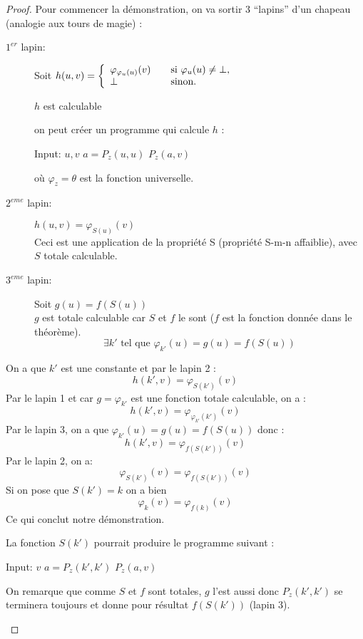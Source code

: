 \begin{proof}
Pour commencer la démonstration, on va sortir 3 ``lapins'' d'un chapeau (analogie aux tours de magie) :
\begin{description}

	\item[$1^{er}$ lapin:] Soit $ h(u,v) = \left\{
	\begin{array}{l l}
		\varphi_{\varphi_{u}(u)}(v) & \quad \text{si }\varphi_u(u)\neq \bot,\\
    	\bot & \quad \text{sinon}.
	\end{array} \right.$

		$h$ est calculable
		\begin{myrem}
			on peut créer un programme qui calcule $h$ :
            \begin{algorithmic}
              \STATE Input: $u,v$
              \STATE $a = P_z(u,u)$
              \STATE $P_z(a,v)$
            \end{algorithmic}
            où $\varphi_z = \theta$ est la fonction universelle.
		\end{myrem}

	\item[$2^{eme}$ lapin:] $h(u,v)=\varphi_{S(u)}(v)$\\
	Ceci est une application de la propriété S (propriété S-m-n affaiblie), avec $S$ totale calculable.
  
	\item[$3^{eme}$ lapin:] Soit $g(u)=f(S(u))$\\
	 $g$ est totale calculable car $S$ et $f$ le sont ($f$
		est la fonction donnée dans le théorème).
		\[ \exists k' \text{ tel que } \varphi_{k'}(u) =g(u)=f(S(u)) \]
\end{description}
On a que $k'$ est une constante et par le lapin 2 :
\[h(k',v) = \varphi_{S(k')}(v)\]
Par le lapin 1 et car $g=\varphi_{k'}$ est une fonction totale calculable, on a :
\[h(k',v) = \varphi_{\varphi_{k'}(k')}(v)\]
Par le lapin 3, on a que $\varphi_{k'}(u) = g(u)=f(S(u))$ donc :
\[h(k',v) = \varphi_{f(S(k'))}(v)\]
Par le lapin 2, on a:
\[ \varphi_{S(k')}(v) =\varphi_{f(S(k'))}(v) \]
Si on pose que $S(k')=k$ on a bien
\[ \varphi_{k}(v) = \varphi_{f(k)}(v) \]
Ce qui conclut notre démonstration.
		\begin{myrem}
          La fonction $S(k')$ pourrait produire le programme suivant :
          \begin{algorithmic}
            \STATE Input: $v$
            \STATE $a = P_z(k',k')$
            \STATE $P_z(a,v)$
          \end{algorithmic}
          On remarque que comme $S$ et $f$ sont totales,
          $g$ l'est aussi donc $P_z(k',k')$ se terminera toujours et donne pour résultat $f(S(k'))$ (lapin 3).


\end{myrem}
\end{proof}
